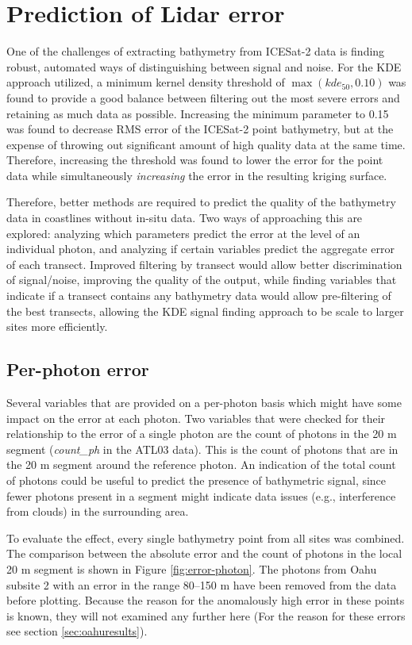 \section{Prediction of Lidar error}

One of the challenges of extracting bathymetry from ICESat-2 data is finding robust, automated ways of distinguishing between signal and noise. For the KDE approach utilized, a minimum kernel density threshold of $\max({kde_{50},0.10})$ was found to provide a good balance between filtering out the most severe errors and retaining as much data as possible. Increasing the minimum parameter to 0.15 was found to decrease RMS error of the ICESat-2 point bathymetry, but at the expense of throwing out significant amount of high quality data at the same time. Therefore, increasing the threshold was found to lower the error for the point data while simultaneously \emph{increasing} the error in the resulting kriging surface.

Therefore, better methods are required to predict the quality of the bathymetry data in coastlines without in-situ data. Two ways of approaching this are explored: analyzing which parameters predict the error at the level of an individual photon, and analyzing if certain variables predict the aggregate error of each transect. Improved filtering by transect would allow better discrimination of signal/noise, improving the quality of the output, while finding variables that indicate if a transect contains any bathymetry data would allow pre-filtering of the best transects, allowing the KDE signal finding approach to be scale to larger sites more efficiently.

\subsection{Per-photon error}
Several variables that are provided on a per-photon basis which might have some impact on the error at each photon. Two variables that were checked for their relationship to the error of a single photon are the count of photons in the 20 m segment (\emph{count\_ph} in the ATL03 data). This is the count of photons that are in the 20 m segment around the reference photon. An indication of the total count of photons could be useful to predict the presence of bathymetric signal, since fewer photons present in a segment might indicate data issues (e.g., interference from clouds) in the surrounding area.

To evaluate the effect, every single bathymetry point from all sites was combined. The comparison between the absolute error and the count of photons in the local 20 m segment is shown in Figure \ref{fig:error-photon}. The photons from Oahu subsite 2 with an error in the range 80--150 m have been removed from the data before plotting. Because the reason for the anomalously high error in these points is known, they will not examined any further here (For the reason for these errors see section \ref{sec:oahuresults}).

